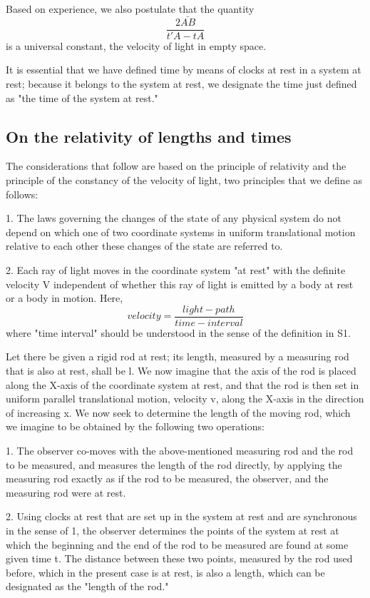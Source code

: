 ﻿\documentclass{article} %
\begin{document}
Based on experience, we also postulate that the quantity 
\begin{equation} \frac{2\bar{AB}}{t'A-tA}  \nonumber\end{equation}
is a universal constant, the velocity of light in empty space. 

It is essential that we have defined time by means of clocks at rest in a system at rest; because it belongs to the system at rest, we designate the time just defined as "the time of the system at rest."

\subsection{
On the relativity of lengths and times
}

The considerations that follow are based on the principle of relativity and the principle of the constancy of the velocity of light, two principles that we define as follows: 

1. 
The laws governing the changes of the state of any physical system do not depend on which one of two coordinate systems in uniform translational motion relative to each other these changes of the state are referred to. 

2. 
Each ray of light moves in the coordinate system "at rest" with the definite velocity V independent of whether this ray of light is emitted by a body at rest or a body in motion. 
Here, 
\begin{equation} velocity=\frac{light-path}{time-interval} \nonumber\end{equation}
 where "time interval" should be understood in the sense of the definition in S1. 

Let there be given a rigid rod at rest; its length, measured by a measuring rod that is also at rest, shall be l. 
We now imagine that the axis of the rod is placed along the X-axis of the coordinate system at rest, and that the rod is then set in uniform parallel translational motion, velocity v, along the X-axis in the direction of increasing x. 
We now seek to determine the length of the moving rod, which we imagine to be obtained by the following two operations: 

1. 
The observer co-moves with the above-mentioned measuring rod and the rod to be measured, and measures the length of the rod directly, by applying the measuring rod exactly as if the rod to be measured, the observer, and the measuring rod were at rest. 

2. 
Using clocks at rest that are set up in the system at rest and are synchronous in the sense of 1, the observer determines the points of the system at rest at which the beginning and the end of the rod to be measured are found at some given time t. 
The distance between these two points, measured by the rod used before, which in the present case is at rest, is also a length, which can be designated as the "length of the rod." 
\end{document}
